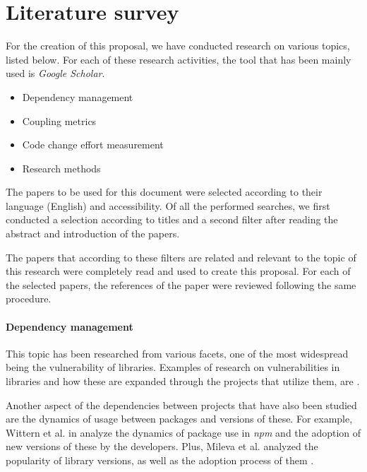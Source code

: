 \section{Literature survey}\label{section:literature} %
For the creation of this proposal, we have conducted research on various topics, listed below. For each of these research activities, the tool that has been mainly used is \textit{Google Scholar}.

\begin{itemize}
    \item Dependency management
    \item Coupling metrics
    \item Code change effort measurement
    \item Research methods
\end{itemize}

\noindent
The papers to be used for this document were selected according to their language (English) and accessibility. Of all the performed searches, we first conducted a selection according to titles and a second filter after reading the abstract and introduction of the papers.

The papers that according to these filters are related and relevant to the topic of this research were completely read and used to create this proposal. For each of the selected papers, the references of the paper were reviewed following the same procedure.

\paragraph{Dependency management}
This topic has been researched from various facets, one of the most widespread being the vulnerability of libraries.
Examples of research on vulnerabilities in libraries and how these are expanded through the projects that utilize them, are \cite{decan2018impact,  hejderup2015dependencies, pashchenko2018vulnerable, plate2015impact}.

Another aspect of the dependencies between projects that have also been studied are the dynamics of usage between packages and versions of these.
For example, Wittern et al. in \cite{wittern2016look} analyze the dynamics of package use in \textit{npm} and the adoption of new versions of these by the developers.
Plus, Mileva et al. analyzed the popularity of library versions, as well as the adoption process of them \cite{mileva2009mining}.

